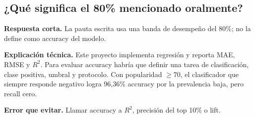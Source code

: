 \subsection*{¿Qué significa el 80\% mencionado oralmente?}
\textbf{Respuesta corta.} La pauta escrita usa una banda de desempeño del 80\%; no la define como
accuracy del modelo.\par
\textbf{Explicación técnica.} Este proyecto implementa regresión y reporta MAE, RMSE y $R^2$. Para
evaluar accuracy habría que definir una tarea de clasificación, clase positiva, umbral y protocolo.
Con popularidad $\geq70$, el clasificador que siempre responde negativo logra 96,36\% accuracy por
la prevalencia baja, pero recall cero.\par
\textbf{Error que evitar.} Llamar accuracy a $R^2$, precisión del top 10\% o lift.
